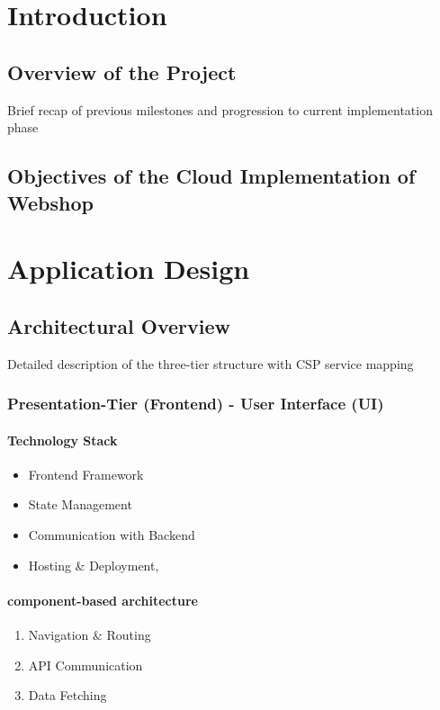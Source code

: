 \documentclass{llncs}
\begin{document}
\section{Introduction}
\subsection{Overview of the Project}
Brief recap of previous milestones and progression to current implementation phase

\subsection{Objectives of the Cloud Implementation of Webshop}


\section{Application Design}
\subsection{Architectural Overview}
Detailed description of the three-tier structure with CSP service mapping
\subsubsection{Presentation-Tier (Frontend) - User Interface (UI)}
\paragraph{Technology Stack}
\begin{itemize}
    \item Frontend Framework
    \item State Management
    \item Communication with Backend
    \item Hosting \& Deployment‚
 
\end{itemize}

\paragraph{component-based architecture}
\begin{enumerate}
    \item Navigation \& Routing
    \item API Communication
    \item Data Fetching
 
\end{enumerate}
\end{document}
